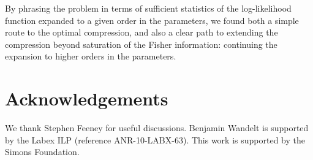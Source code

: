 \documentclass[fleqn,usenatbib]{mnras}
\begin{document}
By phrasing the problem in terms of sufficient statistics of the log-likelihood function expanded to a given order in the parameters, we found both a simple route to the optimal compression, and also a clear path to extending the compression beyond saturation of the Fisher information: continuing the expansion to higher orders in the parameters.
%
\section*{Acknowledgements}
We thank Stephen Feeney for useful discussions. Benjamin Wandelt is supported by the Labex ILP (reference ANR-10-LABX-63). This work is supported by the Simons Foundation.
%



\bsp	%
\label{lastpage}
\end{document}
